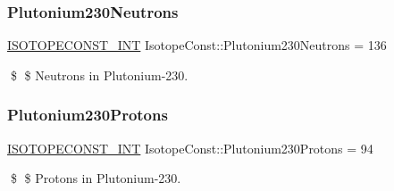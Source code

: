 \subsubsection{\texorpdfstring{Plutonium230\+Neutrons}{Plutonium230Neutrons}}
{\footnotesize\ttfamily \mbox{\hyperlink{group___isotope_const-_macros_ga5f18360b3e99483a35c32d789e62621c}{I\+S\+O\+T\+O\+P\+E\+C\+O\+N\+S\+T\+\_\+\+I\+NT}} Isotope\+Const\+::\+Plutonium230\+Neutrons = 136}

\$ \$ Neutrons in Plutonium-\/230. \mbox{\label{group___isotope_const-_plutonium-_pu230_ga59eb2bddd07e2ed48524d40b75cfa382}} 
\subsubsection{\texorpdfstring{Plutonium230\+Protons}{Plutonium230Protons}}
{\footnotesize\ttfamily \mbox{\hyperlink{group___isotope_const-_macros_ga5f18360b3e99483a35c32d789e62621c}{I\+S\+O\+T\+O\+P\+E\+C\+O\+N\+S\+T\+\_\+\+I\+NT}} Isotope\+Const\+::\+Plutonium230\+Protons = 94}

\$ \$ Protons in Plutonium-\/230. 